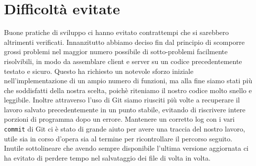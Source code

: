 \documentclass[a4paper, 11pt]{article} %
\begin{document}
\section*{Difficoltà evitate}
Buone pratiche di sviluppo ci hanno evitato contrattempi che si sarebbero altrimenti verificati. Innanzitutto abbiamo deciso fin dal principio di scomporre grossi problemi nel maggior numero possibile di sotto-problemi facilmente risolvibili, in modo da assemblare client e server su un codice precedentemente testato e sicuro. Questo ha richiesto un notevole sforzo iniziale nell'implementazione di un ampio numero di funzioni, ma alla fine siamo stati più che soddisfatti della nostra scelta, poichè riteniamo il nostro codice molto snello e leggibile. Inoltre attraverso l'uso di Git siamo riusciti più volte a recuperare il lavoro salvato precedentemente in un punto stabile, evitando di riscrivere intere porzioni di programma dopo un errore. Mantenere un corretto log con i vari \texttt{commit} di Git ci è stato di grande aiuto per avere una traccia del nostro lavoro, utile sia in corso d'opera sia al termine per ricontrollare il percorso seguito. Inutile sottolineare che avendo sempre disponibile l'ultima versione aggiornata ci ha evitato di perdere tempo nel salvataggio dei file di volta in volta.
\end{document}
